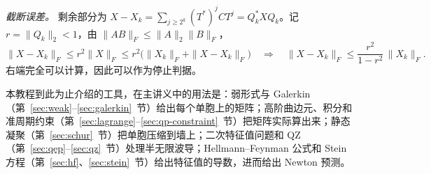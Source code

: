 \documentclass[11pt,a4paper,fontset=fandol]{ctexart}
\begin{document}
\emph{截断误差。} 剩余部分为 $X-X_k=\sum_{j\ge2^k}(T^*)^jCT^j=Q_k^*XQ_k$。记 $r=\|Q_k\|_2<1$，由 $\|AB\|_F\le\|A\|_2\|B\|_F$，
\[
\|X-X_k\|_F\le r^2\|X\|_F\le r^2\bigl(\|X_k\|_F+\|X-X_k\|_F\bigr)
\quad\Longrightarrow\quad
\|X-X_k\|_F\le\frac{r^2}{1-r^2}\,\|X_k\|_F .
\]
右端完全可以计算，因此可以作为停止判据。

\begin{keypoint}
本教程到此为止介绍的工具，在主讲义中的用法是：弱形式与 Galerkin（第~\ref{sec:weak}--\ref{sec:galerkin}~节）给出每个单胞上的矩阵；高阶曲边元、积分和准周期约束（第~\ref{sec:lagrange}--\ref{sec:qp-constraint}~节）把矩阵实际算出来；静态凝聚（第~\ref{sec:schur}~节）把单胞压缩到墙上；二次特征值问题和 QZ（第~\ref{sec:qep}--\ref{sec:qz}~节）处理半无限波导；Hellmann--Feynman 公式和 Stein 方程（第~\ref{sec:hf}、\ref{sec:stein}~节）给出特征值的导数，进而给出 Newton 预测。
\end{keypoint}



\end{document}
